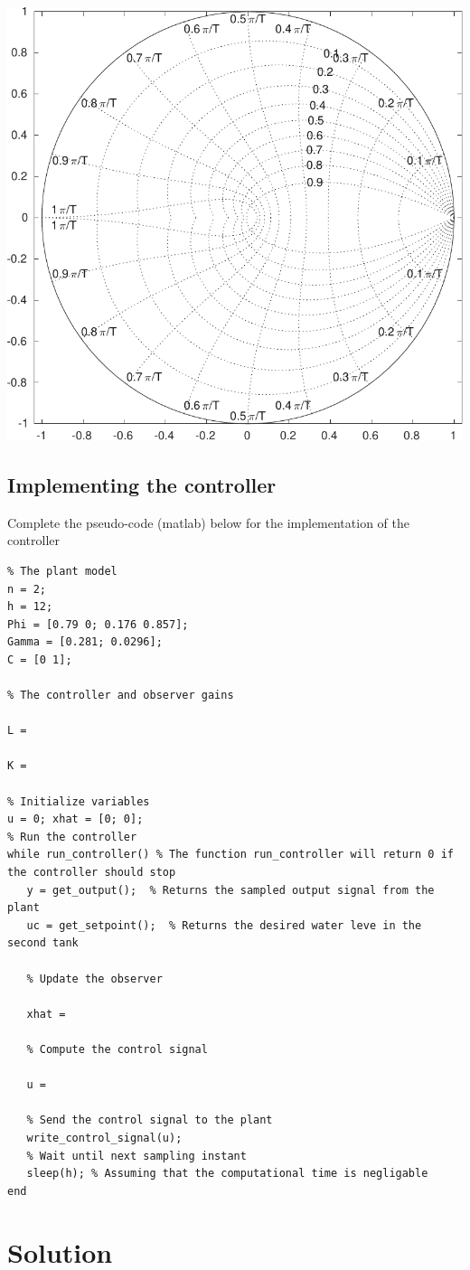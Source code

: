 \documentclass[letterpaper]{scrartcl}
\begin{document}
\begin{center}
\includegraphics[width=0.45\linewidth]{../../figures/zgrid-crop}
\end{center}

\newpage 

\subsection*{Implementing the controller}
\label{sec-0-4}
Complete the pseudo-code (matlab) below for the implementation of the controller
\begin{verbatim}
% The plant model
n = 2;
h = 12; 
Phi = [0.79 0; 0.176 0.857]; 
Gamma = [0.281; 0.0296];
C = [0 1];

% The controller and observer gains

L = 

K = 

% Initialize variables
u = 0; xhat = [0; 0];
% Run the controller 
while run_controller() % The function run_controller will return 0 if the controller should stop
   y = get_output();  % Returns the sampled output signal from the plant
   uc = get_setpoint();  % Returns the desired water leve in the second tank

   % Update the observer

   xhat = 

   % Compute the control signal

   u = 

   % Send the control signal to the plant
   write_control_signal(u);
   % Wait until next sampling instant
   sleep(h); % Assuming that the computational time is negligable
end
\end{verbatim}


\section*{Solution}
\label{sec-1}
\end{document}
